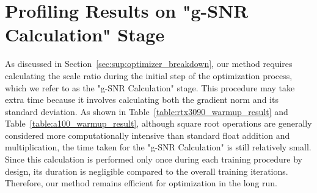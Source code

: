 \section{Profiling Results on "g-SNR Calculation" Stage}

As discussed in Section~\ref{sec:sup:optimizer_breakdown}, our method requires calculating the scale ratio during the initial step of the optimization process, which we refer to as the "g-SNR Calculation" stage. This procedure may take extra time because it involves calculating both the gradient norm and its standard deviation. As shown in Table~\ref{table:rtx3090_warmup_result} and Table~\ref{table:a100_warmup_result}, although square root operations are generally considered more computationally intensive than standard float addition and multiplication, the time taken for the "g-SNR Calculation" is still relatively small. Since this calculation is performed only once during each training procedure by design, its duration is negligible compared to the overall training iterations. Therefore, our method remains efficient for optimization in the long run.





\begin{table}[!htbp]
\centering
\small %
\setlength{\tabcolsep}{6pt} %
\renewcommand{\arraystretch}{1.3} %
\caption{RTX 3090 Profile Results. The results here are based on a single NVIDIA GeForce RTX 3090 GPU. The trials were conducted over 20 iterations, recording the time taken for each optimization step, which is referred to as the "iteration time" column. We compared the time taken for the g-SNR calculation stage and found that it takes an equal amount of time or less than an optimization step. However, since this calculation is only performed once, it is considered tolerable. }
\label{table:rtx3090_warmup_result}
\end{table}




